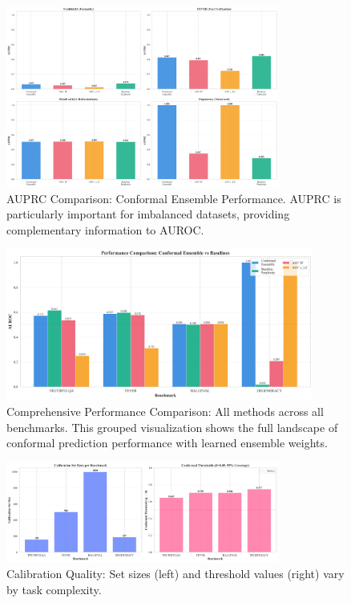 \documentclass[11pt]{article}
\begin{document}
\begin{figure}[h]
\centering
\includegraphics[width=0.8\textwidth]{figures/auprc_comparison_conformal.png}
\caption{AUPRC Comparison: Conformal Ensemble Performance. AUPRC is particularly important for imbalanced datasets, providing complementary information to AUROC.}
\label{fig:conformal-auprc}
\end{figure}

\begin{figure}[h]
\centering
\includegraphics[width=0.9\textwidth]{figures/performance_comparison_conformal.png}
\caption{Comprehensive Performance Comparison: All methods across all benchmarks. This grouped visualization shows the full landscape of conformal prediction performance with learned ensemble weights.}
\label{fig:conformal-performance}
\end{figure}

\begin{figure}[h]
\centering
\includegraphics[width=0.8\textwidth]{figures/calibration_quality.png}
\caption{Calibration Quality: Set sizes (left) and threshold values (right) vary by task complexity.}
\label{fig:calibration-quality}
\end{figure}
\end{document}
